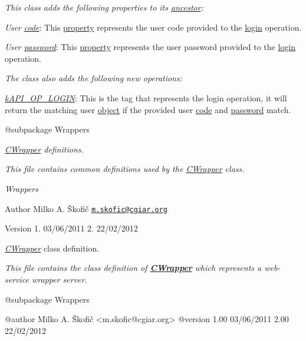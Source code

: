 {\itshape This class adds the following properties to its \hyperlink{class_c_wrapper_client}{ancestor}\-:}

{\itshape 
\begin{DoxyItemize}
\item {\itshape User \hyperlink{}{code}}\-: This \hyperlink{}{property} represents the user code provided to the \hyperlink{}{login} operation. 
\item {\itshape User \hyperlink{}{password}}\-: This \hyperlink{}{property} represents the user password provided to the \hyperlink{}{login} operation. 
\end{DoxyItemize}}

{\itshape The class also adds the following new operations\-:}

{\itshape 
\begin{DoxyItemize}
\item {\itshape \hyperlink{}{k\-A\-P\-I\-\_\-\-O\-P\-\_\-\-L\-O\-G\-I\-N}}\-: This is the tag that represents the login operation, it will return the matching user \hyperlink{class_c_user}{object} if the provided user \hyperlink{}{code} and \hyperlink{}{password} match. 
\end{DoxyItemize}}

{\itshape \begin{DoxyVerb} @subpackage        Wrappers\end{DoxyVerb}
}

{\itshape \hyperlink{class_c_wrapper}{C\-Wrapper} definitions.}

{\itshape This file contains common definitions used by the \hyperlink{class_c_wrapper}{C\-Wrapper} class.}

{\itshape  Wrappers}

{\itshape \begin{DoxyAuthor}{Author}
Milko A. Škofič \href{mailto:m.skofic@cgiar.org}{\tt m.\-skofic@cgiar.\-org} 
\end{DoxyAuthor}
\begin{DoxyVersion}{Version}
1. 03/06/2011 2. 22/02/2012
\end{DoxyVersion}
{\itshape \hyperlink{class_c_wrapper}{C\-Wrapper}} class definition.}

{\itshape This file contains the class definition of {\bfseries \hyperlink{class_c_wrapper}{C\-Wrapper}} which represents a web-\/service wrapper server.}

{\itshape \begin{DoxyVerb} @subpackage        Wrappers

 @author            Milko A. Škofič <m.skofic@cgiar.org>
 @version   1.00 03/06/2011
                    2.00 22/02/2012\end{DoxyVerb}
}

